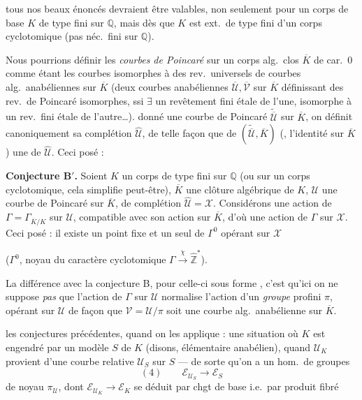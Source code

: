 \documentclass[11pt,a4paper]{article}
\begin{document}

\ill{} tous nos beaux énoncés devraient être valables, non seulement pour un corps de base $K$  de type fini sur $\mathbb{Q}$, mais dès que $K$ est ext.\ de type fini d'un corps cyclotomique (pas néc.\ fini sur $\mathbb{Q}$).

Nous pourrions définir les \emph{courbes de Poincaré} sur un corps alg.\ clos $\overline{K}$ de car.\ $0$ comme étant les courbes isomorphes à des rev.\ universels de courbes alg.\ anabéliennes sur $\overline{K}$ (deux courbes anabéliennes $\overline{\mathcal{U}}, \overline{\mathcal{V}}$ sur $\overline{K}$ définissant des rev.\ de Poincaré isomorphes, ssi $\exists$ un revêtement fini étale de l'une, isomorphe à un rev.\ fini étale de l'autre…).
 donné une courbe de Poincaré $\widetilde{\overline{\mathcal{U}}}$ sur $\overline{K}$,  on définit canoniquement sa complétion $\widehat{\mathcal{U}}$, de telle façon que  de $(\widetilde{\overline{\mathcal{U}}}, \overline{K})$ (,  l'identité sur $\overline{K}$)  une  de $\widehat{\mathcal{U}}$.
Ceci posé :


\textbf{Conjecture B$'$.} Soient $K$ un corps de type fini sur $\mathbb{Q}$ (ou sur un corps cyclotomique, cela simplifie peut-être), $\overline{K}$ une clôture algébrique de $K$, $\mathcal{U}$ une courbe de Poincaré sur $\overline{K}$, de complétion $\widehat{\mathcal{U}} = \mathcal{X}$.
Considérons une action de $\Gamma = \Gamma_{\overline{K}/K}$ sur $\mathcal{U}$, compatible avec son action sur $\overline{K}$, d'où une action de $\Gamma$ sur $\mathcal{X}$. Ceci posé : il existe un point fixe et un seul de $\Gamma^{0}$ opérant sur $\mathcal{X}$

($\Gamma^{0}$, noyau du caractère cyclotomique $\Gamma \xrightarrow{\chi} \widehat{\mathbb{Z}}^{*}$).

La différence avec la conjecture B, pour celle-ci sous forme , c'est qu'ici on ne suppose \emph{pas} que l'action de $\Gamma$ sur $\mathcal{U}$ normalise l'action d'un \emph{groupe} profini $\pi$, opérant  sur $\mathcal{U}$ de façon que $\mathcal{V} = \mathcal{U}/\pi$ soit une courbe alg.\ anabélienne sur $\overline{K}$.

 \ill{} les conjectures précédentes, quand on les applique : une situation où $K$ est engendré par un modèle $S$ de $K$ (disons, élémentaire anabélien), quand $\mathcal{U}_K$ provient d'une courbe relative $\mathcal{U}_S$ sur $S$ --- de sorte qu'on a un hom.\ de groupes
\[
(4)\qquad \mathcal{E}_{\mathcal{U}_S} \longrightarrow \mathcal{E}_S
\]
de noyau $\pi_{\mathcal{U}}$, dont $\mathcal{E}_{\mathcal{U}_K} \to \mathcal{E}_K$ se déduit par chgt de base i.e.\ par produit fibré
\end{document}
